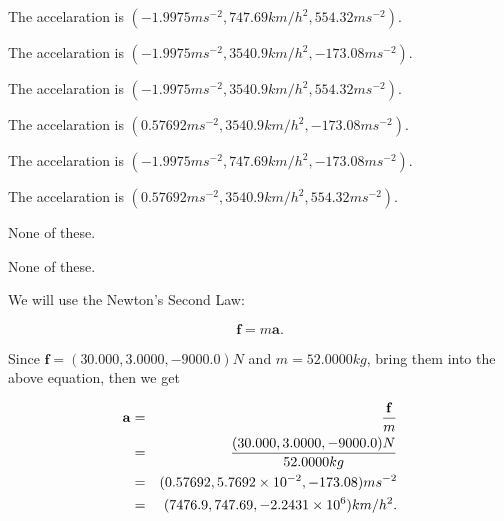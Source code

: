 \documentclass[12pt]{article}
\begin{document}
 
 
The accelaration is
$(
-1.9975ms^{-2},
747.69km/h^2,
554.32ms^{-2}
).
$
 
 
The accelaration is
$(
-1.9975ms^{-2},
3540.9km/h^2,
-173.08ms^{-2}
).
$
 
 
The accelaration is
$(
-1.9975ms^{-2},
3540.9km/h^2,
554.32ms^{-2}
).
$
 
 
The accelaration is
$(
0.57692ms^{-2},
3540.9km/h^2,
-173.08ms^{-2}
).
$
 
 
The accelaration is
$(
-1.9975ms^{-2},
747.69km/h^2,
-173.08ms^{-2}
).
$
 
 
The accelaration is
$(
0.57692ms^{-2},
3540.9km/h^2,
554.32ms^{-2}
).
$
 
 
 None of these.
 
 
\noindent{}
 
 
 None of these.
 
 
\noindent{}
 
 
 
 
 
 
\noindent{}
 
 

We will use the Newton's Second Law:
 
\[
\mathbf{f}=m\mathbf{a}.
\]
 
Since $\mathbf{f}=( %
30.000,  %
3.0000,  %
-9000.0 )N$
and $m= %
52.0000kg$, bring them into the above equation, then we get
 
\begin{eqnarray*}
\mathbf{a}&=&\frac{\mathbf{f}}m  \\
&=&\frac{(
30.000 ,
3.0000 ,
-9000.0 )N
}{ %
52.0000 kg}  \\
&=&(
0.57692 ,
5.7692 \times 10^{-2},
-173.08
)ms^{-2} \\
&=&(
7476.9 ,
747.69 ,
-2.2431 \times 10^{6}
)km/h^2.
\end{eqnarray*}
 
 
 
\noindent{}
 
\end{document}
